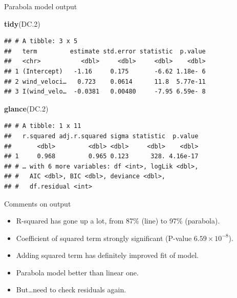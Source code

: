 \documentclass[
  ignorenonframetext,
]{beamer}
\newenvironment{Shaded}{\begin{snugshade}}{\end{snugshade}}
\newcommand{\FloatTok}[1]{\textcolor[rgb]{0.00,0.00,0.81}{#1}}
\newcommand{\KeywordTok}[1]{\textcolor[rgb]{0.13,0.29,0.53}{\textbf{#1}}}
\newcommand{\NormalTok}[1]{#1}
\providecommand{\tightlist}{%
  \setlength{\itemsep}{0pt}\setlength{\parskip}{0pt}}
\begin{document}
\begin{frame}[fragile]{Parabola model output}
\protect\hypertarget{parabola-model-output}{}

\begin{Shaded}
\begin{Highlighting}[]
\KeywordTok{tidy}\NormalTok{(DC}\FloatTok{.2}\NormalTok{)}
\end{Highlighting}
\end{Shaded}

\begin{verbatim}
## # A tibble: 3 x 5
##   term         estimate std.error statistic  p.value
##   <chr>           <dbl>     <dbl>     <dbl>    <dbl>
## 1 (Intercept)   -1.16     0.175       -6.62 1.18e- 6
## 2 wind_veloci…   0.723    0.0614      11.8  5.77e-11
## 3 I(wind_velo…  -0.0381   0.00480     -7.95 6.59e- 8
\end{verbatim}

\begin{Shaded}
\begin{Highlighting}[]
\KeywordTok{glance}\NormalTok{(DC}\FloatTok{.2}\NormalTok{)}
\end{Highlighting}
\end{Shaded}

\begin{verbatim}
## # A tibble: 1 x 11
##   r.squared adj.r.squared sigma statistic  p.value
##       <dbl>         <dbl> <dbl>     <dbl>    <dbl>
## 1     0.968         0.965 0.123      328. 4.16e-17
## # … with 6 more variables: df <int>, logLik <dbl>,
## #   AIC <dbl>, BIC <dbl>, deviance <dbl>,
## #   df.residual <int>
\end{verbatim}

\end{frame}

\begin{frame}{Comments on output}
\protect\hypertarget{comments-on-output}{}

\begin{itemize}
\tightlist
\item
  R-squared has gone up a lot, from 87\% (line) to 97\% (parabola).
\item
  Coefficient of squared term strongly significant (P-value
  \(6.59 \times 10^{−8}\)).
\item
  Adding squared term has definitely improved fit of model.
\item
  Parabola model better than linear one.
\item
  But\ldots need to check residuals again.
\end{itemize}

\end{frame}
\end{document}
